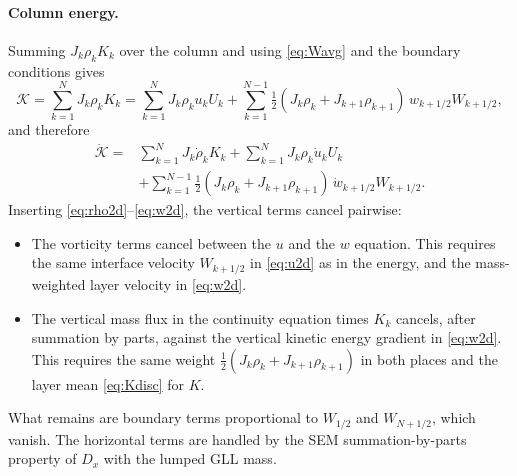 \documentclass[11pt,a4paper]{article}
\begin{document}
\paragraph{Column energy.}
Summing $J_k\rho_kK_k$ over the column and using \eqref{eq:Wavg} and the
boundary conditions gives
\begin{equation}
  \mathcal K = \sum_{k=1}^N J_k\rho_kK_k
   = \sum_{k=1}^N J_k\rho_k u_kU_k
   + \sum_{k=1}^{N-1}\tfrac12(J_k\rho_k + J_{k+1}\rho_{k+1})\,w_{k+1/2}W_{k+1/2},
\end{equation}
and therefore
\begin{equation}
\begin{split}
  \dot{\mathcal K} = {}&\sum_{k=1}^N J_k\dot\rho_kK_k
   + \sum_{k=1}^N J_k\rho_k\dot u_kU_k\\
   &+ \sum_{k=1}^{N-1}\tfrac12(J_k\rho_k + J_{k+1}\rho_{k+1})\,\dot w_{k+1/2}W_{k+1/2}.
\end{split}
\end{equation}
Inserting \eqref{eq:rho2d}--\eqref{eq:w2d}, the vertical terms cancel pairwise:
\begin{itemize}
\item The vorticity terms cancel between the $u$ and the $w$ equation.
  This requires the same interface velocity $W_{k+1/2}$ in \eqref{eq:u2d} as
  in the energy, and the mass-weighted layer velocity in \eqref{eq:w2d}.
\item The vertical mass flux in the continuity equation times $K_k$ cancels,
  after summation by parts, against the vertical kinetic energy gradient
  in \eqref{eq:w2d}. This requires the same weight
  $\tfrac12(J_k\rho_k + J_{k+1}\rho_{k+1})$ in both places and the layer
  mean \eqref{eq:Kdisc} for $K$.
\end{itemize}
What remains are boundary terms proportional to $W_{1/2}$ and $W_{N+1/2}$,
which vanish. The horizontal terms are handled by the SEM summation-by-parts
property of $D_x$ with the lumped GLL mass.
\end{document}
